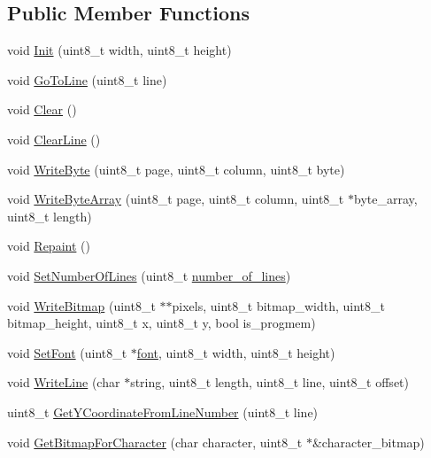 \subsection*{Public Member Functions}
\begin{DoxyCompactItemize}
\item 
void \hyperlink{class_o_l_e_d_a2c8205c8eac9d7a2b181657561e9b4d2}{Init} (uint8\+\_\+t width, uint8\+\_\+t height)
\item 
void \hyperlink{class_o_l_e_d_a8d314130676b104ed959b92ab4bac25e}{Go\+To\+Line} (uint8\+\_\+t line)
\item 
void \hyperlink{class_o_l_e_d_a6c7bb1fc91b3e574a275f90643da140a}{Clear} ()
\item 
void \hyperlink{class_o_l_e_d_a3a571f5ea7a183fa14932cd5b2c423eb}{Clear\+Line} ()
\item 
void \hyperlink{class_o_l_e_d_a7fa307269dbd2e80a6e48a1442df83d2}{Write\+Byte} (uint8\+\_\+t page, uint8\+\_\+t column, uint8\+\_\+t byte)
\item 
void \hyperlink{class_o_l_e_d_a7fffc17a5439300d361414c15a7a2dbe}{Write\+Byte\+Array} (uint8\+\_\+t page, uint8\+\_\+t column, uint8\+\_\+t $\ast$byte\+\_\+array, uint8\+\_\+t length)
\item 
void \hyperlink{class_o_l_e_d_a3efa34861b4ae0bc5323f6b7cf1d8a01}{Repaint} ()
\item 
void \hyperlink{class_o_l_e_d_aa3c88e19f05340036ea5ac9e2d1ea5dc}{Set\+Number\+Of\+Lines} (uint8\+\_\+t \hyperlink{class_o_l_e_d_a9ea1c55112deede1a61142af276a6bc9}{number\+\_\+of\+\_\+lines})
\item 
void \hyperlink{class_o_l_e_d_a3cb468f16387343f6db387a86cded8af}{Write\+Bitmap} (uint8\+\_\+t $\ast$$\ast$pixels, uint8\+\_\+t bitmap\+\_\+width, uint8\+\_\+t bitmap\+\_\+height, uint8\+\_\+t x, uint8\+\_\+t y, bool is\+\_\+progmem)
\item 
void \hyperlink{class_o_l_e_d_abe6073c961cadc4c9b693eb8dc8198bd}{Set\+Font} (uint8\+\_\+t $\ast$\hyperlink{class_o_l_e_d_a29ab86a4a73f4d343bf1810927f0911d}{font}, uint8\+\_\+t width, uint8\+\_\+t height)
\item 
void \hyperlink{class_o_l_e_d_a0ffccb4fd874b997c869c5d511f76df8}{Write\+Line} (char $\ast$string, uint8\+\_\+t length, uint8\+\_\+t line, uint8\+\_\+t offset)
\item 
uint8\+\_\+t \hyperlink{class_o_l_e_d_a5b6d41d5d699998f54ea6e3b6562ac5b}{Get\+Y\+Coordinate\+From\+Line\+Number} (uint8\+\_\+t line)
\item 
void \hyperlink{class_o_l_e_d_a3bd2f2f05568441e1e0533eaf0db58f8}{Get\+Bitmap\+For\+Character} (char character, uint8\+\_\+t $\ast$\&character\+\_\+bitmap)
\end{DoxyCompactItemize}
